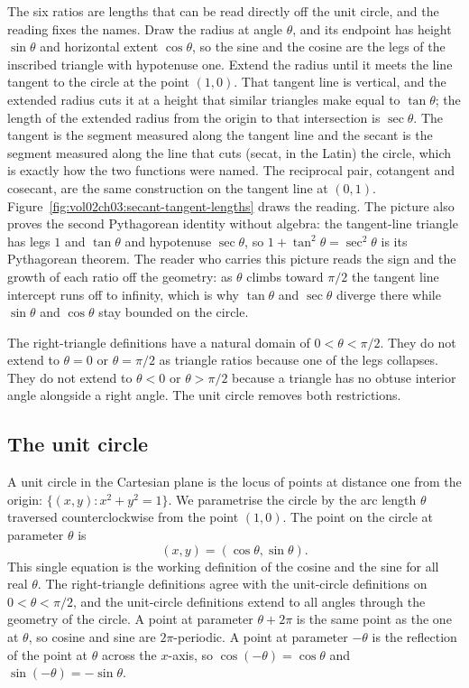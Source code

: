The six ratios are lengths that can be read directly off the unit
circle, and the reading fixes the names. Draw the radius at angle
$\theta$, and its endpoint has height $\sin\theta$ and horizontal
extent $\cos\theta$, so the sine and the cosine are the legs of the
inscribed triangle with hypotenuse one. Extend the radius until it
meets the line tangent to the circle at the point $(1, 0)$. That
tangent line is vertical, and the extended radius cuts it at a height
that similar triangles make equal to $\tan\theta$; the length of the
extended radius from the origin to that intersection is $\sec\theta$.
The tangent is the segment measured along the tangent line and the
secant is the segment measured along the line that cuts (secat, in
the Latin) the circle, which is exactly how the two functions were
named. The reciprocal pair, cotangent and cosecant, are the same
construction on the tangent line at $(0, 1)$.
Figure~\ref{fig:vol02ch03:secant-tangent-lengths} draws the reading.
The picture also proves the second Pythagorean identity without
algebra: the tangent-line triangle has legs $1$ and $\tan\theta$ and
hypotenuse $\sec\theta$, so $1 + \tan^{2}\theta = \sec^{2}\theta$ is
its Pythagorean theorem. The reader who carries this picture reads
the sign and the growth of each ratio off the geometry: as $\theta$
climbs toward $\pi/2$ the tangent line intercept runs off to
infinity, which is why $\tan\theta$ and $\sec\theta$ diverge there
while $\sin\theta$ and $\cos\theta$ stay bounded on the circle.



The right-triangle definitions have a natural domain of
$0 < \theta < \pi/2$. They do not extend to $\theta = 0$
or $\theta = \pi/2$ as triangle ratios because one of the legs
collapses. They do not extend to $\theta < 0$ or $\theta > \pi/2$
because a triangle has no obtuse interior angle alongside a right
angle. The unit circle removes both restrictions.

\subsection{The unit circle}

A unit circle in the Cartesian plane is the locus of points at
distance one from the origin: $\{(x, y) : x^{2} + y^{2} = 1\}$. We
parametrise the circle by the arc length $\theta$ traversed
counterclockwise from the point $(1, 0)$. The point on the circle
at parameter $\theta$ is
\[
(x, y) = (\cos\theta, \sin\theta).
\]
This single equation is the working definition of the cosine and
the sine for all real $\theta$. The right-triangle definitions
agree with the unit-circle definitions on $0 < \theta < \pi/2$, and
the unit-circle definitions extend to all angles through the
geometry of the circle. A point at parameter $\theta + 2\pi$ is the
same point as the one at $\theta$, so cosine and sine are
$2\pi$-periodic. A point at parameter $-\theta$ is the reflection
of the point at $\theta$ across the $x$-axis, so $\cos(-\theta) =
\cos\theta$ and $\sin(-\theta) = -\sin\theta$.

